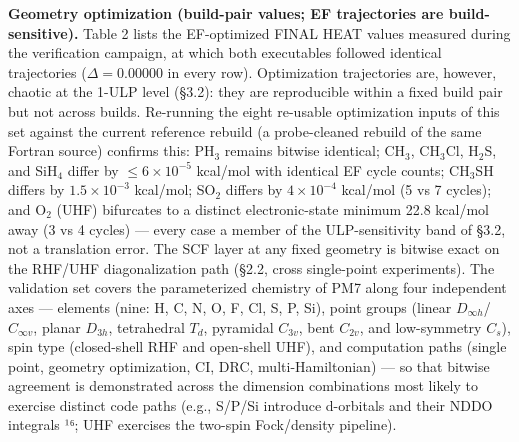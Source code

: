 \documentclass[preprint,12pt]{elsarticle}
\begin{document}
\textbf{Geometry optimization (build-pair values; EF trajectories are build-sensitive).} Table 2 lists the EF-optimized FINAL HEAT values measured during the verification campaign, at which both executables followed identical trajectories ($\Delta = $0.00000 in every row). Optimization trajectories are, however, chaotic at the 1-ULP level (\S{}3.2): they are reproducible within a fixed build pair but not across builds. Re-running the eight re-usable optimization inputs of this set against the current reference rebuild (a probe-cleaned rebuild of the same Fortran source) confirms this: PH$_{3}$ remains bitwise identical; CH$_{3}$, CH$_{3}$Cl, H$_{2}$S, and SiH$_{4}$ differ by $\leq$$6\times 10^{-5}$ kcal/mol with identical EF cycle counts; CH$_{3}$SH differs by $1.5\times 10^{-3}$ kcal/mol; SO$_{2}$ differs by $4\times 10^{-4}$ kcal/mol (5 vs 7 cycles); and O$_{2}$ (UHF) bifurcates to a distinct electronic-state minimum 22.8 kcal/mol away (3 vs 4 cycles) --- every case a member of the ULP-sensitivity band of \S{}3.2, not a translation error. The SCF layer at any fixed geometry is bitwise exact on the RHF/UHF diagonalization path (\S{}2.2, cross single-point experiments). The validation set covers the parameterized chemistry of PM7 along four independent axes --- elements (nine: H, C, N, O, F, Cl, S, P, Si), point groups (linear $D_{\infty h}$/$C_{\infty v}$, planar $D_{3h}$, tetrahedral $T_d$, pyramidal $C_{3v}$, bent $C_{2v}$, and low-symmetry $C_s$), spin type (closed-shell RHF and open-shell UHF), and computation paths (single point, geometry optimization, CI, DRC, multi-Hamiltonian) --- so that bitwise agreement is demonstrated across the dimension combinations most likely to exercise distinct code paths (e.g., S/P/Si introduce d-orbitals and their NDDO integrals ¹⁶; UHF exercises the two-spin Fock/density pipeline).
\end{document}
